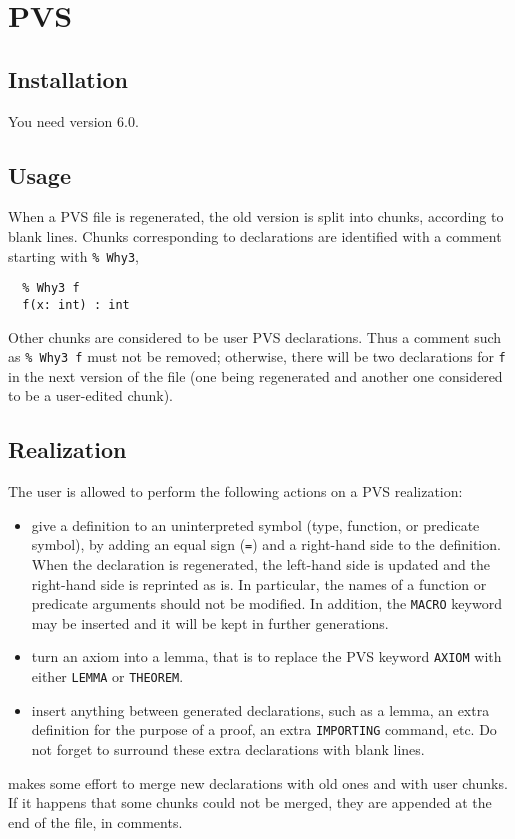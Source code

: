 \section{PVS}
\label{sec:pvs}


\subsection{Installation}

You need version 6.0.

\subsection{Usage}

When a PVS file is regenerated, the old version is split into chunks,
according to blank lines. Chunks corresponding to \why declarations
are identified with a comment starting with \verb+% Why3+, \eg
\begin{verbatim}
  % Why3 f
  f(x: int) : int
\end{verbatim}
Other chunks are considered to be user PVS declarations.
Thus a comment such as \verb+% Why3 f+ must not be removed;
otherwise, there will be two
declarations for \texttt{f} in the next version of the file (one being
regenerated and another one considered to be a user-edited chunk).

\subsection{Realization}

The user is allowed to perform the following actions on a PVS
realization:
\begin{itemize}
\item give a definition to an uninterpreted symbol (type, function, or
  predicate symbol), by adding an equal sign (\texttt{=}) and a
  right-hand side to the definition. When the declaration is
  regenerated, the left-hand side is updated and the right-hand side
  is reprinted as is. In particular, the names of a function or
  predicate arguments should not be modified. In addition, the
  \texttt{MACRO} keyword may be inserted and it will be kept in
  further generations.

\item turn an axiom into a lemma, that is to replace the PVS keyword
  \texttt{AXIOM} with either \texttt{LEMMA} or \texttt{THEOREM}.

\item insert anything between generated declarations, such as a lemma,
  an extra definition for the purpose of a proof, an extra
  \texttt{IMPORTING} command, etc. Do not forget to surround these
  extra declarations with blank lines.
\end{itemize}
\why makes some effort to merge new declarations with old ones
and with user chunks. If it happens that some chunks could not be
merged, they are appended at the end of the file, in comments.


